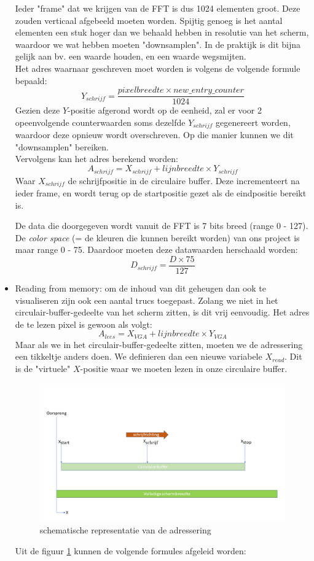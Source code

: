 \documentclass[a4paper,kul]{kulakarticle} %
\begin{document}
\begin{itemize}
	Ieder "frame" dat we krijgen van de FFT is dus 1024 elementen groot. Deze zouden verticaal afgebeeld moeten worden. Spijtig genoeg is het aantal elementen een stuk hoger dan we behaald hebben in resolutie van het scherm, waardoor we wat hebben moeten "downsamplen". In de praktijk is dit bijna gelijk aan bv. een waarde houden, en een waarde wegsmijten.\\
	
	Het adres waarnaar geschreven moet worden is volgens de volgende formule bepaald:
	$$Y_{schrijf} = \frac{pixelbreedte \times new\_entry\_counter }{1024} $$
	Gezien deze $Y$-positie afgerond wordt op de eenheid, zal er voor 2 opeenvolgende counterwaarden soms dezelfde $Y_{schrijf}$ gegenereert worden, waardoor deze opnieuw wordt overschreven. Op die manier kunnen we dit "downsamplen" bereiken.\\
	Vervolgens kan het adres berekend worden:
	$$ A_{schrijf} = X_{schrijf} + lijnbreedte \times Y_{schrijf} $$
	Waar $X_{schrijf}$ de schrijfpositie in de circulaire buffer. Deze incrementeert na ieder frame, en wordt terug op de startpositie gezet als de eindpositie bereikt is.
	
	De data die doorgegeven wordt vanuit de FFT is 7 bits breed (range 0 - 127). De \textit{color space} (= de kleuren die kunnen bereikt worden) van ons project is maar range 0 - 75. Daardoor moeten deze datawaarden herschaald worden:
	$$D_{schrijf} = \frac{D \times 75}{127}$$
	
	\item Reading from memory: om de inhoud van dit geheugen dan ook te visualiseren zijn ook een aantal trucs toegepast. Zolang we niet in het circulair-buffer-gedeelte van het scherm zitten, is dit vrij eenvoudig. Het adres de te lezen pixel is gewoon als volgt: 
	$$ A_{lees} = X_{VGA} + lijnbreedte \times Y_{VGA} $$
	Maar als we in het circulair-buffer-gedeelte zitten, moeten we de adressering een tikkeltje anders doen. We definieren dan een nieuwe variabele $X_{read}$. Dit is de "virtuele" $X$-positie waar we moeten lezen in onze circulaire buffer.


\begin{figure}[H]
	\centering
	\includegraphics[width=0.7\linewidth]{leesAdressering.png}
	\caption{schematische representatie van de adressering}
	\label{fig:leesAdressering}
\end{figure}
	Uit de figuur \ref{fig:leesAdressering} kunnen de volgende formules afgeleid worden:
	\\
	

\end{itemize}
\end{document}
